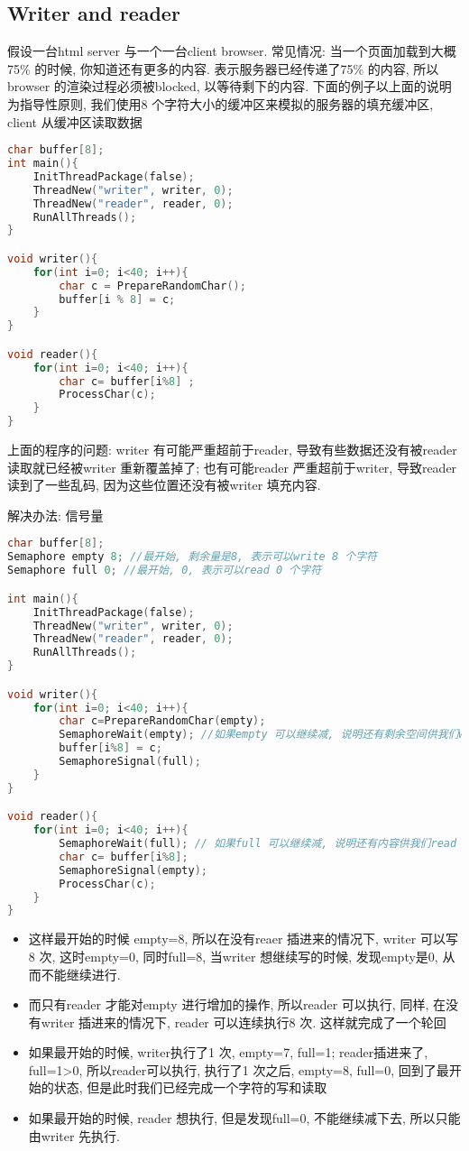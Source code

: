 \documentclass{article}
\begin{document}
\subsection{Writer and reader}
假设一台html server 与一个一台client browser.
常见情况: 当一个页面加载到大概75\% 的时候, 你知道还有更多的内容. 表示服务器已经传递了75\% 的内容, 所以browser 的渲染过程必须被blocked, 以等待剩下的内容.
下面的例子以上面的说明为指导性原则, 我们使用8 个字符大小的缓冲区来模拟的服务器的填充缓冲区, client 从缓冲区读取数据

\begin{lstlisting}[language = C]
char buffer[8];
int main(){
	InitThreadPackage(false);
	ThreadNew("writer", writer, 0);
	ThreadNew("reader", reader, 0);
	RunAllThreads();
}

void writer(){
	for(int i=0; i<40; i++){
		char c = PrepareRandomChar();
		buffer[i % 8] = c;
	}
}

void reader(){
	for(int i=0; i<40; i++){
		char c= buffer[i%8] ;
		ProcessChar(c);
	}
}
\end{lstlisting}
上面的程序的问题:
writer 有可能严重超前于reader, 导致有些数据还没有被reader 读取就已经被writer 重新覆盖掉了;
也有可能reader 严重超前于writer, 导致reader 读到了一些乱码, 因为这些位置还没有被writer 填充内容.

解决办法: 信号量

\begin{lstlisting}[language = C]
char buffer[8];
Semaphore empty 8; //最开始, 剩余量是8, 表示可以write 8 个字符
Semaphore full 0; //最开始, 0, 表示可以read 0 个字符

int main(){
	InitThreadPackage(false);
	ThreadNew("writer", writer, 0);
	ThreadNew("reader", reader, 0);
	RunAllThreads();
}

void writer(){
	for(int i=0; i<40; i++){
		char c=PrepareRandomChar(empty);
		SemaphoreWait(empty); //如果empty 可以继续减, 说明还有剩余空间供我们write
		buffer[i%8] = c;
		SemaphoreSignal(full);
	}
}

void reader(){
	for(int i=0; i<40; i++){
		SemaphoreWait(full); // 如果full 可以继续减, 说明还有内容供我们read
		char c= buffer[i%8];
		SemaphoreSignal(empty);
		ProcessChar(c);
	}
}
\end{lstlisting}

\begin{itemize}
	\item 这样最开始的时候 empty=8, 所以在没有reaer 插进来的情况下, writer 可以写8 次, 这时empty=0, 同时full=8, 当writer 想继续写的时候, 发现empty是0, 从而不能继续进行.
	\item 而只有reader 才能对empty 进行增加的操作, 所以reader 可以执行, 同样, 在没有writer 插进来的情况下, reader 可以连续执行8 次. 这样就完成了一个轮回
	\item 如果最开始的时候, writer执行了1 次, empty=7, full=1; reader插进来了, full=1>0, 所以reader可以执行, 执行了1 次之后, empty=8, full=0, 回到了最开始的状态, 但是此时我们已经完成一个字符的写和读取
	\item 如果最开始的时候, reader 想执行, 但是发现full=0, 不能继续减下去, 所以只能由writer 先执行.
\end{itemize}
\end{document}
